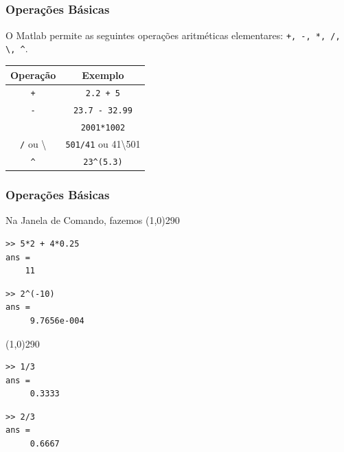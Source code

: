 \documentclass{beamer}
\newcommand{\delim}{\line(1,0){290}}
\begin{document}
\subsection[Opera\c{c}\~oes B\'asicas]{}
\frame
{
\frametitle{Opera\c{c}\~oes B\'asicas}

O Matlab permite as seguintes opera\c{c}\~oes aritm\'eticas elementares: {\tt +,
-, *, /, \textbackslash,  \textasciicircum}.
\pause

\begin{center}
\begin{tabular}{|c|c|}
\hline
Opera\c{c}\~ao & Exemplo \\ \hline
{\tt +} & {\tt 2.2 + 5} \\ \hline
{\tt -} & {\tt 23.7 - 32.99} \\ \hline
{\tt *} & {\tt 2001*1002} \\ \hline
{\tt /} ou \textbackslash & {\tt 501/41} ou 41\textbackslash501 \\ \hline
{\tt \textasciicircum} & {\tt 23\textasciicircum(5.3)} \\ \hline
\end{tabular}
\end{center}

}

\begin{frame}[fragile]
 \frametitle{Opera\c{c}\~oes B\'asicas}

Na Janela de Comando, fazemos
\pause
\delim
\begin{center}
\begin{minipage}{4 cm}
\begin{verbatim}
>> 5*2 + 4*0.25
ans =
    11
\end{verbatim}
\end{minipage}
\begin{minipage}{4 cm}
\begin{verbatim}
>> 2^(-10)
ans =
     9.7656e-004
\end{verbatim}
\end{minipage}
\end{center}
\delim
\pause

\begin{center}
\begin{minipage}{4 cm}
\begin{verbatim}
>> 1/3
ans =
     0.3333
\end{verbatim}
\end{minipage}
\begin{minipage}{4 cm}
\begin{verbatim}
>> 2/3
ans =
     0.6667
\end{verbatim}
\end{minipage}
\end{center}

\end{frame}
\end{document}
